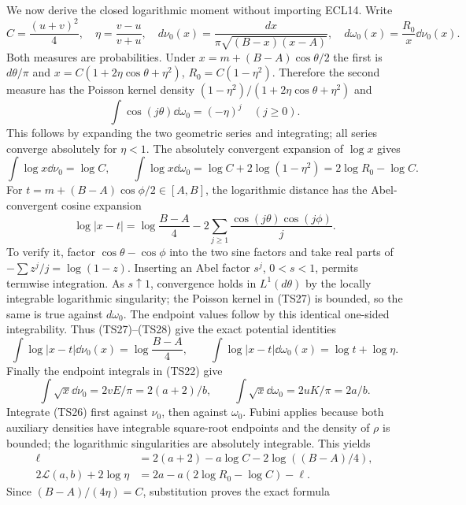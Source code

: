 \documentclass[11pt,a4paper]{article}
\begin{document}
We now derive the closed logarithmic moment without importing ECL14.
Write
\[
 C=\frac{(u+v)^2}{4},\quad\eta=\frac{v-u}{v+u},\quad
 d\nu_0(x)=\frac{dx}{\pi\sqrt{(B-x)(x-A)}},\quad
 d\omega_0(x)=\frac{R_0}{x}\dd\nu_0(x).
\]
Both measures are probabilities. Under $x=m+(B-A)\cos\theta/2$
the first is $d\theta/\pi$ and
$x=C(1+2\eta\cos\theta+\eta^2)$,
$R_0=C(1-\eta^2)$. Therefore the second measure has the Poisson
kernel density $(1-\eta^2)/(1+2\eta\cos\theta+\eta^2)$ and
\begin{equation}\tag{TS27}
 \int\cos(j\theta)\dd\omega_0=(-\eta)^j\quad(j\geq0).
\end{equation}
This follows by expanding the two geometric series and integrating;
all series converge absolutely for $\eta<1$.
The absolutely convergent expansion of $\log x$ gives
\begin{equation}\tag{TS28}
 \int\log x\dd\nu_0=\log C,\qquad
 \int\log x\dd\omega_0=\log C+2\log(1-\eta^2)
 =2\log R_0-\log C.
\end{equation}
For $t=m+(B-A)\cos\phi/2\in[A,B]$, the logarithmic distance has
the Abel-convergent cosine expansion
\[
 \log|x-t|=\log\frac{B-A}{4}
       -2\sum_{j\geq1}\frac{\cos(j\theta)\cos(j\phi)}j.
\]
To verify it, factor $\cos\theta-\cos\phi$ into the two sine
factors and take real parts of $-\sum z^j/j=\log(1-z)$.
Inserting an Abel factor $s^j$, $0<s<1$, permits termwise
integration. As $s\uparrow1$, convergence holds in $L^1(d\theta)$
by the locally integrable logarithmic singularity; the Poisson
kernel in (TS27) is bounded, so the same is true against $d\omega_0$.
The endpoint values follow by this identical one-sided integrability.
Thus (TS27)--(TS28) give the exact potential identities
\begin{equation}\tag{TS29}
 \int\log|x-t|\dd\nu_0(x)=\log\frac{B-A}{4},\qquad
 \int\log|x-t|\dd\omega_0(x)=\log t+\log\eta.
\end{equation}
Finally the endpoint integrals in (TS22) give
\[
 \int\sqrt x\dd\nu_0=2vE/\pi=2(a+2)/b,\qquad
 \int\sqrt x\dd\omega_0=2uK/\pi=2a/b.
\]
Integrate (TS26) first against $\nu_0$, then against $\omega_0$.
Fubini applies because both auxiliary densities have integrable
square-root endpoints and the density of $\rho$ is bounded;
the logarithmic singularities are absolutely integrable. This yields
\begin{align*}
 \ell&=2(a+2)-a\log C-2\log((B-A)/4),\\
 2\mathcal L(a,b)+2\log\eta
 &=2a-a(2\log R_0-\log C)-\ell.
\end{align*}
Since $(B-A)/(4\eta)=C$, substitution proves the exact formula
\end{document}
